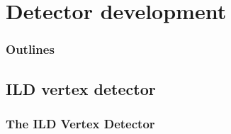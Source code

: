 \documentclass{beamer}
\begin{document}
\section{Detector development}
\begin{frame}
    \frametitle{Outlines}
    \begin{minipage}{\textwidth}
      \tableofcontents[currentsection,hideothersubsections, 
      sectionstyle=show/shaded,]
    \end{minipage}
\end{frame}

  \subsection{ILD vertex detector}
  \begin{frame}[label=vxd]
    \frametitle{The ILD Vertex Detector}


\end{frame}
\end{document}
